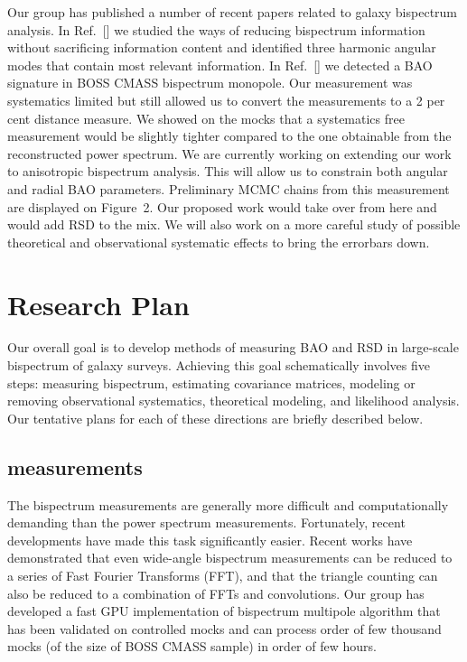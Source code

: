 Our group has published a number of recent papers related to galaxy bispectrum
analysis. In Ref.~[] we studied the ways of reducing bispectrum information
without sacrificing information content and identified three harmonic angular
modes that contain most relevant information. In Ref.~[] we detected a BAO
signature in BOSS CMASS bispectrum monopole. Our measurement was systematics
limited but still allowed us to convert the measurements to a 2 per cent
distance measure. We showed on the mocks that a systematics free measurement
would be slightly tighter compared to the one obtainable from the reconstructed
power spectrum. We are currently working on extending our work to anisotropic
bispectrum analysis. This will allow us to constrain both angular and radial
BAO parameters. Preliminary MCMC chains from this measurement are displayed on
Figure~2. Our proposed work would take over from here and would add RSD to the
mix. We will also work on a more careful study of possible theoretical and
observational systematic effects to bring the errorbars down.


\section{Research Plan}

Our overall goal is to develop methods of measuring BAO and RSD in large-scale
bispectrum of galaxy surveys. Achieving this goal schematically involves five
steps: measuring bispectrum, estimating covariance matrices, modeling or
removing observational systematics, theoretical modeling, and likelihood
analysis. Our tentative plans for each of these directions are briefly
described below.

\subsection*{measurements}

The bispectrum measurements are generally more difficult and computationally
demanding than the power spectrum measurements. Fortunately, recent
developments have made this task significantly easier. Recent works have
demonstrated that even wide-angle bispectrum measurements can be reduced to a
series of Fast Fourier Transforms (FFT), and that the triangle counting can
also be reduced  to a combination of FFTs and convolutions. Our group has
developed a fast GPU implementation of bispectrum multipole algorithm that has
been validated on controlled mocks and can process order of few thousand mocks
(of the size of BOSS CMASS sample) in order of few hours.

